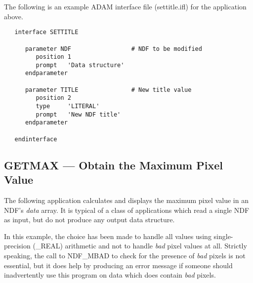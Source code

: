 \documentclass[twoside,11pt]{article}
\newcommand{\htmlref}[2]{#1}
\newcommand{\xref}[3]{#1}
\newcommand{\xlabel}[1]{}
\newcommand{\st}[1]{{\em{#1}}}
\begin{document}
The following is an example \xref{ADAM}{sg4}{} interface file
(settitle.ifl) for the application above. 

\small
\begin{verbatim}
   interface SETTITLE

      parameter NDF                 # NDF to be modified
         position 1
         prompt   'Data structure'
      endparameter

      parameter TITLE               # New title value
         position 2
         type     'LITERAL'
         prompt   'New NDF title'
      endparameter

   endinterface
\end{verbatim}
\normalsize

\newpage
\subsection{\xlabel{GETMAX}GETMAX --- Obtain the Maximum Pixel Value}

The following application calculates and displays the maximum pixel value in an
NDF's \st{data\/} array. It is typical of a class of applications which read a
single NDF as input, but do not produce any output data structure.

In this example, the choice has been made to handle all values using
single-precision (\_REAL) arithmetic and not to handle \st{bad\/}
pixel values at all.  Strictly speaking, the call to \htmlref{NDF\_MBAD}{NDF_MBAD} to
check for the presence of \st{bad\/} pixels is not essential, but it
does help by producing an error message if someone should
inadvertently use this program on data which does contain \st{bad\/}
pixels.
\end{document}
